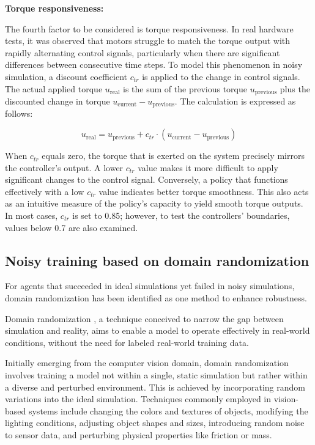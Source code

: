 \textbf{Torque responsiveness:}

The fourth factor to be considered is torque responsiveness. In real hardware tests, it was observed that motors struggle to match the torque output with rapidly alternating control signals, particularly when there are significant differences between consecutive time steps. To model this phenomenon in noisy simulation, a discount coefficient \( c_{tr} \) is applied to the change in control signals. The actual applied torque \(u_{\text{real}}\) is the sum of the previous torque \(u_{\text{previous}}\) plus the discounted change in torque \(u_{\text{current}} - u_{\text{previous}}\). The calculation is expressed as follows:

\begin{equation}
 u_{\text{real}} = u_{\text{previous}} + c_{tr} \cdot (u_{\text{current}} - u_{\text{previous}})
\end{equation}

When \(c_{tr}\) equals zero, the torque that is exerted on the system precisely mirrors the controller's output. A lower \(c_{tr}\) value makes it more difficult to apply significant changes to the control signal. Conversely, a policy that functions effectively with a low \(c_{tr}\) value indicates better torque smoothness. This also acts as an intuitive measure of the policy's capacity to yield smooth torque outputs. In most cases, \(c_{tr}\) is set to 0.85; however, to test the controllers' boundaries, values below 0.7 are also examined.

\subsection{Noisy training based on domain randomization}
For agents that succeeded in ideal simulations yet failed in noisy simulations, domain randomization has been identified as one method to enhance robustness.

Domain randomization \cite{tobin2017domain}, a technique conceived to narrow the gap between simulation and reality, aims to enable a model to operate effectively in real-world conditions, without the need for labeled real-world training data.

Initially emerging from the computer vision domain, domain randomization involves training a model not within a single, static simulation but rather within a diverse and perturbed environment. This is achieved by incorporating random variations into the ideal simulation. Techniques commonly employed in vision-based systems include changing the colors and textures of objects, modifying the lighting conditions, adjusting object shapes and sizes, introducing random noise to sensor data, and perturbing physical properties like friction or mass.

